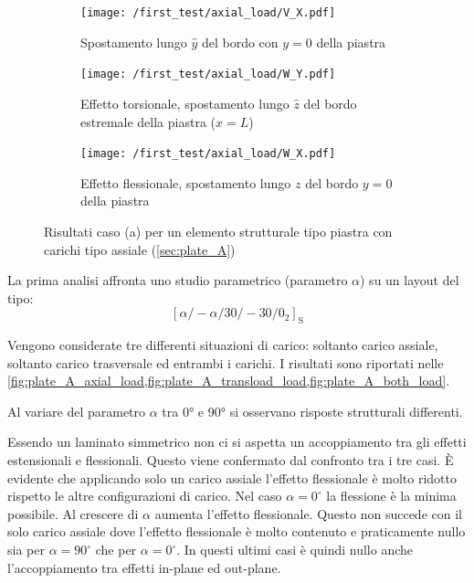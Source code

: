 \documentclass[a4paper,num-refs]{oup-contemporary}
\begin{document}
\begin{figure}[bt!]
	\centering
	
	\begin{subfigure}[t]{0.3\textwidth}
		\centering
		\texttt{[image: /first\_test/axial\_load/V\_X.pdf]}
		\caption{Spostamento lungo $\hat y$ del bordo con $y=0$ della piastra}
		
	\end{subfigure}
	\hfill
	\begin{subfigure}[t]{0.3\textwidth}
		\centering
		\texttt{[image: /first\_test/axial\_load/W\_Y.pdf]}
		
		\caption{Effetto torsionale, spostamento lungo $\hat z$ del bordo estremale della piastra ($x=L$)}
		
	\end{subfigure}
	\hfill
	\begin{subfigure}[t]{0.3\textwidth}
		\centering
		\texttt{[image: /first\_test/axial\_load/W\_X.pdf]}
		\caption{Effetto flessionale, spostamento lungo $z$ del bordo $y=0$ della piastra}
		
	\end{subfigure}
	\hfill
	\caption{Risultati caso (a) per un elemento strutturale tipo piastra con carichi tipo assiale (\cref{sec:plate_A})}
	\label{fig:plate_A_axial_load}
\end{figure}



La prima analisi affronta uno studio parametrico (parametro $\alpha$) su un layout del tipo:
\begin{equation}
	\left[\alpha /-\alpha / 30 /-30 / 0_{2}\right]_{\mathrm{S}}
\end{equation}

Vengono considerate tre differenti situazioni di carico: soltanto carico assiale, soltanto carico trasversale ed entrambi i carichi. I risultati sono riportati nelle \cref{fig:plate_A_axial_load,fig:plate_A_transload_load,fig:plate_A_both_load}. 

Al variare del parametro $\alpha$ tra 0° e 90° si osservano risposte strutturali differenti.

Essendo un laminato simmetrico non ci si aspetta un accoppiamento tra gli effetti estensionali e flessionali. Questo viene confermato dal confronto tra i tre casi. È evidente che applicando solo un carico assiale l'effetto flessionale è molto ridotto rispetto le altre configurazioni di carico. Nel caso $\alpha=0^\circ$ la flessione è la minima possibile. Al crescere di $\alpha$ aumenta l'effetto flessionale. Questo non succede con il solo carico assiale dove l'effetto flessionale è molto contenuto e praticamente nullo sia per $\alpha=90^\circ$ che per $\alpha=0^\circ$. In questi ultimi casi è quindi nullo anche l'accoppiamento tra effetti in-plane ed out-plane. 
\end{document}
